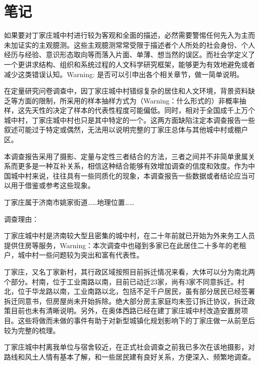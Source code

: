 \chapter{笔记}
\label{cha:notes}

如果要对丁家庄城中村进行较为客观和全面的描述，必然需要警惕任何先入为主而未加证实的主观臆测。这些主观臆测常常受限于描述者个人所处的社会身份、个人经历与经验、意识形态取向等而落入片面、单薄、想当然的误区。而社会学定义了一个更讲求结构、组织和系统过程的人文科学研究框架，能够更为有效地避免或者减少这类错误认知。Warning: 是否可以引申出各个相关章节，做一简单说明。

在定量研究问卷调查中，因丁家庄城中村错综复杂的居住和人文环境，背景资料缺乏等方面的限制，所采用的样本抽样方式为（Warning：什么形式的）非概率抽样，这先天性的决定了样本的代表性程度可能偏低。同时，相对于全国成千上万个城中村，丁家庄城中村也只是其中特定的一个。这两方面缺陷注定本调查报告一些叙述可能过于特定或偶然，无法用以说明完整的丁家庄总体与其他城中村或棚户区。

本调查报告采用了摄影、定量与定性三者结合的方法，三者之间并不非简单隶属关系而更多是一种互补关系，相信这种结合能够有效增加调查的信度和效度。作为中国城中村来说，往往具有一些同质化的现象，本调查报告一些数据或者结论应当可以用于借鉴或参考这些现象。

丁家庄属于济南市姚家街道……地理位置……

调查理由：

丁家庄城中村是济南较大型且密集的城中村，在二十年前就已开始为外来务工人员提供住房等服务，Warning：本次调查中也碰到多家已在此居住二十多年的老租户，城中村一些问题较为突出和富有代表性。

丁家庄，又名丁家新村，其行政区域按照目前拆迁情况来看，大体可以分为南北两个部分。村南，位于工业南路以南，目前已动迁23家，尚有3家不同意拆迁。村北，位于华龙路以南，工业南路以北，包括不足千户居民，虽有部分居民已经签署拆迁同意书，但房屋尚未开始拆除。绝大部分房主家庭均未签订拆迁协议，拆迁政策目前也未有清晰说明。另外，在奥体西路已经在建丁家庄城中村改造安置房项目。这些将做而未做的事件有助于对新型城镇化规划影响下的丁家庄做一从前至后较为完整的梳理。

丁家庄城中村离我单位与宿舍较近，在正式社会调查之前我已多次在该地摄影，对路线和风土人情有基本了解，和一些居民建有良好关系，方便深入、频繁地调查。

